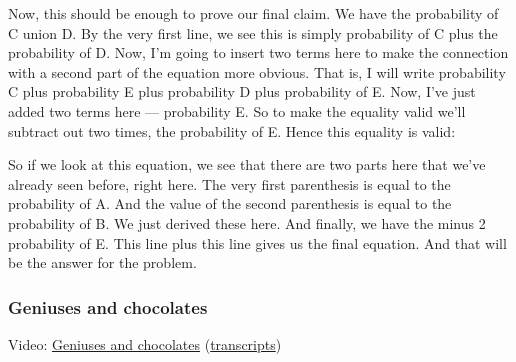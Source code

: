 \documentclass[pdftex, brazil, 12pt, twoside]{article}
\begin{document}
Now, this should be enough to prove our final claim.
We have the probability of C union
D. By the very first line, we see this is simply
probability of C plus the probability of D.
Now, I'm going to insert two terms here
to make the connection with a second part
of the equation more obvious.
That is, I will write probability C plus probability
E plus probability D plus probability of E. Now,
I've just added two terms here --- probability E. So
to make the equality valid we'll subtract out
two times, the probability of E.
Hence this equality is valid:

\begin{figure}[H]
  \begin{center}
  \end{center}
\end{figure}

So if we look at this equation, we
see that there are two parts here that we've already
seen before, right here.
The very first parenthesis is equal to the probability of A.
And the value of the second parenthesis
is equal to the probability of B. We just derived these here.
And finally, we have the minus 2 probability of E.
This line plus this line gives us the final equation.
And that will be the answer for the problem.

\subsubsection{Geniuses and chocolates}
\label{un1-solved-problems-geniuses}

Video: \href{https://www.youtube.com/watch?v=03ckSzMreeM}{Geniuses and chocolates}
(\href{Unit-1/03\_solved\_problems/sp\_2\_transcripts.jpg}{transcripts})
\end{document}

